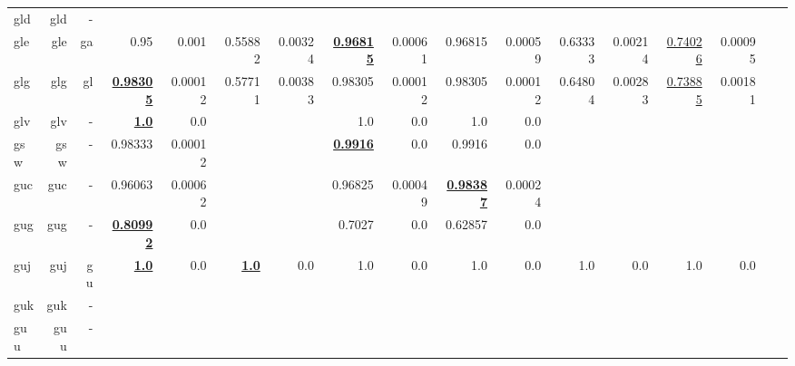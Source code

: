 \documentclass[11pt]{article}
\begin{document}
\begin{table*}[h]
{\begin{tabular}{lrrrrrrrrrrrrrrrr}
gld         & gld         & -         &          &          &          &          &          &          &          &          &          &          &          &          \\
gle         & gle         & ga         & 0.95         & 0.001         & 0.55882         & 0.00324         & \textbf{\underline{0.96815}}         & 0.00061         & 0.96815         & 0.00059         & 0.63333         & 0.00214         & \underline{0.74026}         & 0.00095         \\
glg         & glg         & gl         & \textbf{\underline{0.98305}}         & 0.00012         & 0.57711         & 0.00383         & 0.98305         & 0.00012         & 0.98305         & 0.00012         & 0.64804         & 0.00283         & \underline{0.73885}         & 0.00181         \\
glv         & glv         & -         & \textbf{\underline{1.0}}         & 0.0         &          &          & 1.0         & 0.0         & 1.0         & 0.0         &          &          &          &          \\
gsw         & gsw         & -         & 0.98333         & 0.00012         &          &          & \textbf{\underline{0.9916}}         & 0.0         & 0.9916         & 0.0         &          &          &          &          \\
guc         & guc         & -         & 0.96063         & 0.00062         &          &          & 0.96825         & 0.00049         & \textbf{\underline{0.98387}}         & 0.00024         &          &          &          &          \\
gug         & gug         & -         & \textbf{\underline{0.80992}}         & 0.0         &          &          & 0.7027         & 0.0         & 0.62857         & 0.0         &          &          &          &          \\
guj         & guj         & gu         & \textbf{\underline{1.0}}         & 0.0         & \textbf{\underline{1.0}}         & 0.0         & 1.0         & 0.0         & 1.0         & 0.0         & 1.0         & 0.0         & 1.0         & 0.0         \\
guk         & guk         & -         &          &          &          &          &          &          &          &          &          &          &          &          \\
guu         & guu         & -         &          &          &          &          &          &          &          &          &          &          &          &          \\

\end{tabular}}
\end{table*}
\end{document}
